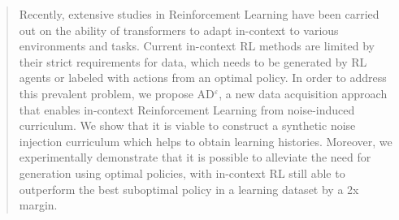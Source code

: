 \documentclass{article}
\theoremstyle{plain}
\theoremstyle{definition}
\theoremstyle{remark}
\begin{document}
\printAffiliationsAndNotice{\icmlEqualContribution}
\begin{abstract}
Recently, extensive studies in Reinforcement Learning have been carried out on the ability of transformers to adapt in-context to various environments and tasks. Current in-context RL methods are limited by their strict requirements for data, which needs to be generated by RL agents or labeled with actions from an optimal policy. In order to address this prevalent problem, we propose AD$^\varepsilon$, a new data acquisition approach that enables in-context Reinforcement Learning from noise-induced curriculum. We show that it is viable to construct a synthetic noise injection curriculum which helps to obtain learning histories. Moreover, we experimentally demonstrate that it is possible to alleviate the need for generation using optimal policies, with in-context RL still able to outperform the best suboptimal policy in a learning dataset by a 2x margin.
\end{abstract}
\end{document}
